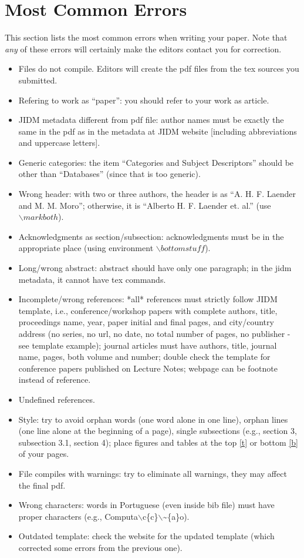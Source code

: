 \documentclass[jidm,a4paper]{jidm} %
\begin{document}
\section{Most Common Errors}

This section lists the most common errors when writing your paper. Note that \textit{any} of these errors will certainly make the editors contact you for correction.

\begin{itemize}
	\item Files do not compile. Editors will create the pdf files from the tex sources you submitted.
	\item Refering to work as ``paper'': you should refer to your work as article.
	\item JIDM metadata different from pdf file: author names must be exactly the same in the pdf as in the metadata at JIDM website [including abbreviations and uppercase letters].
	\item Generic categories: the item ``Categories and Subject Descriptors'' should be other than ``Databases'' (since that is too generic).
	\item Wrong header: with two or three authors, the header is as ``A. H. F. Laender and M. M. Moro''; otherwise, it is ``Alberto H. F. Laender et. al.'' (use $\backslash markboth$).
	\item Acknowledgments as section/subsection: acknowledgments must be in the appropriate place (using environment $\backslash bottomstuff$).
	\item Long/wrong abstract: abstract should have only one paragraph; in the jidm metadata, it cannot have tex commands.
	\item Incomplete/wrong references: *all* references must strictly follow JIDM template, i.e., conference/workshop papers with complete authors, title, proceedings name, year, paper initial and final pages, and city/country address (no series, no url, no date, no total number of pages, no publisher - see template example); journal articles must have authors, title, journal name, pages, both volume and number; double check the template for conference papers published on Lecture Notes; webpage can be footnote instead of reference.
	\item Undefined references.
	\item Style: try to avoid orphan words (one word alone in one line), orphan lines (one line alone at the beginning of a page), single subsections (e.g., section 3, subsection 3.1, section 4); place figures and tables at the top \url{[t]} or bottom \url{[b]} of your pages.
	\item File compiles with warnings: try to eliminate all warnings, they may affect the final pdf.
	\item Wrong characters: words in Portuguese (even inside bib file) must have proper characters (e.g., Computa$\backslash$c\{c\}$\backslash$\textasciitilde\{a\}o).
	\item Outdated template: check the website for the updated template (which corrected some errors from the previous one).
\end{itemize}
	


\begin{received}
\end{received}
\end{document}
